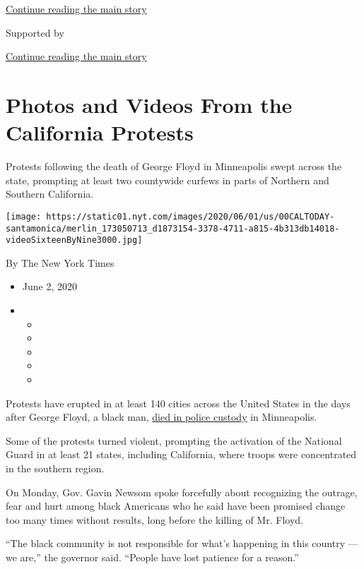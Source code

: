 \protect\hyperlink{after-top}{Continue reading the main story}

Supported by

\protect\hyperlink{after-sponsor}{Continue reading the main story}

\hypertarget{photos-and-videos-from-the-california-protests}{%
\section{Photos and Videos From the California
Protests}\label{photos-and-videos-from-the-california-protests}}

Protests following the death of George Floyd in Minneapolis swept across
the state, prompting at least two countywide curfews in parts of
Northern and Southern California.

\texttt{[image: https://static01.nyt.com/images/2020/06/01/us/00CALTODAY-santamonica/merlin\_173050713\_d1873154-3378-4711-a815-4b313db14018-videoSixteenByNine3000.jpg]}

By The New York Times

\begin{itemize}
\item
  June 2, 2020
\item
  \begin{itemize}
  \item
  \item
  \item
  \item
  \item
  \end{itemize}
\end{itemize}

Protests have erupted in at least 140 cities across the United States in
the days after George Floyd, a black man,
\href{https://www.nytimes.com/2020/05/31/us/george-floyd-investigation}{died
in police custody} in Minneapolis.

Some of the protests turned violent, prompting the activation of the
National Guard in at least 21 states, including California, where troops
were concentrated in the southern region.

On Monday, Gov. Gavin Newsom spoke forcefully about recognizing the
outrage, fear and hurt among black Americans who he said have been
promised change too many times without results, long before the killing
of Mr. Floyd.

``The black community is not responsible for what's happening in this
country --- we are,'' the governor said. ``People have lost patience for
a reason.''

